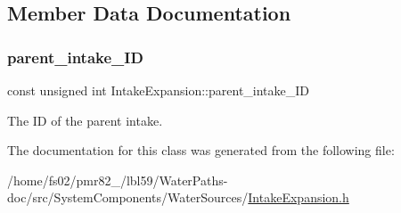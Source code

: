 \subsection{Member Data Documentation}
\mbox{\label{classIntakeExpansion_a93569405968a66226046e730e691615c}} 
\subsubsection{\texorpdfstring{parent\+\_\+intake\+\_\+\+ID}{parent\_intake\_ID}}
{\footnotesize\ttfamily const unsigned int Intake\+Expansion\+::parent\+\_\+intake\+\_\+\+ID}



The ID of the parent intake. 



The documentation for this class was generated from the following file\+:\begin{DoxyCompactItemize}
\item 
/home/fs02/pmr82\+\_/lbl59/\+Water\+Paths-\/doc/src/\+System\+Components/\+Water\+Sources/\mbox{\hyperlink{IntakeExpansion_8h}{Intake\+Expansion.\+h}}\end{DoxyCompactItemize}
